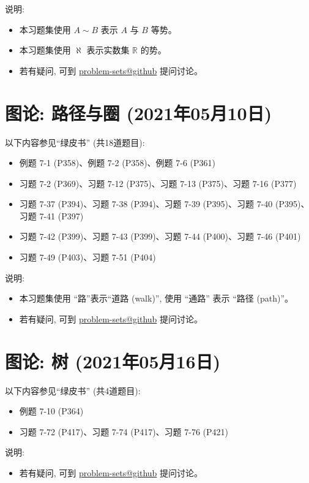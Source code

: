 \documentclass{article}
\begin{document}
说明:
\begin{itemize}
  \item 本习题集使用 $A \sim B$ 表示 $A$ 与 $B$ 等势。
  \item 本习题集使用 $\aleph$ 表示实数集 $\mathbb{R}$ 的势。
  \item 若有疑问, 可到 \href{https://github.com/courses-at-nju-by-hfwei/discrete-math-problem-sets/discussions}{problem-sets@github} 提问讨论。
\end{itemize}
\section{图论: 路径与圈 (2021年05月10日)}

以下内容参见``绿皮书'' (共18道题目):
\begin{itemize}
  \item 例题 7-1 (P358)、例题 7-2 (P358)、例题 7-6 (P361)
  \item 习题 7-2 (P369)、习题 7-12 (P375)、习题 7-13 (P375)、习题 7-16 (P377)
  \item 习题 7-37 (P394)、习题 7-38 (P394)、习题 7-39 (P395)、习题 7-40 (P395)、
  习题 7-41 (P397)
  \item 习题 7-42 (P399)、习题 7-43 (P399)、习题 7-44 (P400)、习题 7-46 (P401)
  \item 习题 7-49 (P403)、习题 7-51 (P404)
\end{itemize}

说明:
\begin{itemize}
  \item 本习题集使用 ``路''表示``道路 (walk)'', 使用 ``通路'' 表示 ``路径 (path)''。
  \item 若有疑问, 可到 \href{https://github.com/courses-at-nju-by-hfwei/discrete-math-problem-sets/discussions}{problem-sets@github} 提问讨论。
\end{itemize}
\section{图论: 树 (2021年05月16日)}

以下内容参见``绿皮书'' (共4道题目):
\begin{itemize}
  \item 例题 7-10 (P364)
  \item 习题 7-72 (P417)、习题 7-74 (P417)、习题 7-76 (P421)
\end{itemize}

说明:
\begin{itemize}
  \item 若有疑问, 可到 \href{https://github.com/courses-at-nju-by-hfwei/discrete-math-problem-sets/discussions}{problem-sets@github} 提问讨论。
\end{itemize}
\end{document}
